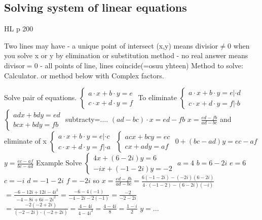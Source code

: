 \subsection{Solving system of linear equations}
HL p 200

Two lines may have
- a unique point of intersect (x,y) means divisior$\neq0$ when you solve x or y by elimination or substitution method
- no real answer means divisor$=0$
- all points of line, lines coincide(=osuu yhteen)
Method to solve: Calculator.
or method below with Complex factors.

Solve pair of equations. $\begin{cases}a\cdot x+b\cdot y=e \\ c\cdot x+d\cdot y=f\end{cases}$
To eliminate  $\begin{cases}a\cdot x+b\cdot y=e|\cdot d \\ c\cdot x+d\cdot y=f|\cdot b\end{cases}$
 $\begin{cases}adx +bdy =ed\\bcx+bdy=fb \end{cases}$
subtracty=....
$(ad-bc)\cdot x=ed-fb$
$x=\frac{ed-fb}{ad-bc}$ and eliminate of x
 $\begin{cases}a\cdot x+b\cdot y=e |\cdot c\\c\cdot x+d\cdot y=f |\cdot a\end{cases}$
$\begin{cases}acx+bcy=ec\\cx+ady=af\end{cases}$
$0+(bc-ad)y=ec-af$
$y=\frac{ec-af}{bc-ad}$
Example Solve $\begin{cases}4x+(6-2i)y=6\\-ix+(-1-2i)y=-2\end{cases}$
$a=4$ $b=6-2i$ $e=6$
$c=-i$ $d=-1-2i$ $f=-2i$
so $x=\frac{ed-fb}{ad-bc}=\frac{6(-1-2i)-(-2i)(6-2i)}{4\cdot(-1-2)-(6-2i)(-i)}$
$=\frac{-6-12i+12i-4i^2}{-4-8i+6i-2i^2}=\frac{-6-4(-1)}{-4-2i-2(-1)}=\frac{-2}{-2-2i}$
$=\frac{-2(-2+2i)}{(-2-2i)\cdot(-2+2i)}=\frac{4-4i}{4-4i^2}=\frac{4-4i}{8}=\frac{1-i}{2}$
$y=...$
